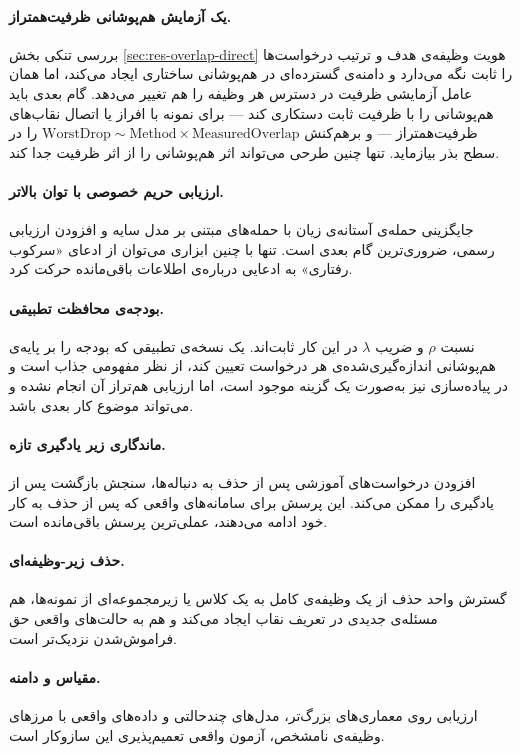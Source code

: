 \paragraph{یک آزمایش هم‌پوشانی ظرفیت‌همتراز.} بررسی تنکی بخش \ref{sec:res-overlap-direct} هویت وظیفه‌ی هدف و ترتیب درخواست‌ها را ثابت نگه می‌دارد و دامنه‌ی گسترده‌ای در هم‌پوشانی ساختاری ایجاد می‌کند، اما همان عامل آزمایشی ظرفیت در دسترس هر وظیفه را هم تغییر می‌دهد. گام بعدی باید هم‌پوشانی را با ظرفیت ثابت دستکاری کند — برای نمونه با افراز یا اتصال نقاب‌های ظرفیت‌همتراز — و برهم‌کنش $\text{WorstDrop}\sim\text{Method}\times\text{MeasuredOverlap}$ را در سطح بذر بیازماید. تنها چنین طرحی می‌تواند اثر هم‌پوشانی را از اثر ظرفیت جدا کند.

\paragraph{ارزیابی حریم خصوصی با توان بالاتر.} جایگزینی حمله‌ی آستانه‌ی زیان با حمله‌های مبتنی بر مدل سایه و افزودن ارزیابی رسمی، ضروری‌ترین گام بعدی است. تنها با چنین ابزاری می‌توان از ادعای «سرکوب رفتاری» به ادعایی درباره‌ی اطلاعات باقی‌مانده حرکت کرد.

\paragraph{بودجه‌ی محافظت تطبیقی.} نسبت $\rho$ و ضریب $\lambda$ در این کار ثابت‌اند. یک نسخه‌ی تطبیقی که بودجه را بر پایه‌ی هم‌پوشانی اندازه‌گیری‌شده‌ی هر درخواست تعیین کند، از نظر مفهومی جذاب است و در پیاده‌سازی نیز به‌صورت یک گزینه موجود است، اما ارزیابی هم‌تراز آن انجام نشده و می‌تواند موضوع کار بعدی باشد.

\paragraph{ماندگاری زیر یادگیری تازه.} افزودن درخواست‌های آموزشی پس از حذف به دنباله‌ها، سنجش بازگشت پس از یادگیری را ممکن می‌کند. این پرسش برای سامانه‌های واقعی که پس از حذف به کار خود ادامه می‌دهند، عملی‌ترین پرسش باقی‌مانده است.

\paragraph{حذف زیر-وظیفه‌ای.} گسترش واحد حذف از یک وظیفه‌ی کامل به یک کلاس یا زیرمجموعه‌ای از نمونه‌ها، هم مسئله‌ی جدیدی در تعریف نقاب ایجاد می‌کند و هم به حالت‌های واقعی حق فراموش‌شدن نزدیک‌تر است.

\paragraph{مقیاس و دامنه.} ارزیابی روی معماری‌های بزرگ‌تر، مدل‌های چندحالتی و داده‌های واقعی با مرزهای وظیفه‌ی نامشخص، آزمون واقعی تعمیم‌پذیری این سازوکار است.

